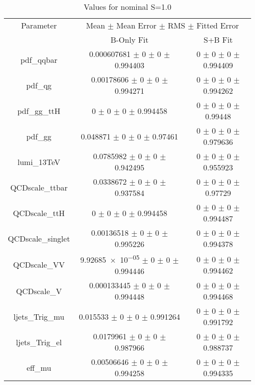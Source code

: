 \begin{table}
\centering
\caption{Values for nominal S=1.0}
\begin{tabular}{ccc}
\toprule
Parameter 	& \multicolumn{2}{c}{Mean $\pm$ Mean Error $\pm$ RMS $\pm$ Fitted Error}\\
 	& B-Only Fit & S+B Fit\\
\midrule
pdf\_qqbar 	& \num{0.000607681} $\pm$ \num{0} $\pm$ \num{0} $\pm$ \num{0.994403} 	& \num{0} $\pm$ \num{0} $\pm$ \num{0} $\pm$ \num{0.994409}\\
pdf\_qg 	& \num{0.00178606} $\pm$ \num{0} $\pm$ \num{0} $\pm$ \num{0.994271} 	& \num{0} $\pm$ \num{0} $\pm$ \num{0} $\pm$ \num{0.994262}\\
pdf\_gg\_ttH 	& \num{0} $\pm$ \num{0} $\pm$ \num{0} $\pm$ \num{0.994458} 	& \num{0} $\pm$ \num{0} $\pm$ \num{0} $\pm$ \num{0.99448}\\
pdf\_gg 	& \num{0.048871} $\pm$ \num{0} $\pm$ \num{0} $\pm$ \num{0.97461} 	& \num{0} $\pm$ \num{0} $\pm$ \num{0} $\pm$ \num{0.979636}\\
lumi\_13TeV 	& \num{0.0785982} $\pm$ \num{0} $\pm$ \num{0} $\pm$ \num{0.942495} 	& \num{0} $\pm$ \num{0} $\pm$ \num{0} $\pm$ \num{0.955923}\\
QCDscale\_ttbar 	& \num{0.0338672} $\pm$ \num{0} $\pm$ \num{0} $\pm$ \num{0.937584} 	& \num{0} $\pm$ \num{0} $\pm$ \num{0} $\pm$ \num{0.97729}\\
QCDscale\_ttH 	& \num{0} $\pm$ \num{0} $\pm$ \num{0} $\pm$ \num{0.994458} 	& \num{0} $\pm$ \num{0} $\pm$ \num{0} $\pm$ \num{0.994487}\\
QCDscale\_singlet 	& \num{0.00136518} $\pm$ \num{0} $\pm$ \num{0} $\pm$ \num{0.995226} 	& \num{0} $\pm$ \num{0} $\pm$ \num{0} $\pm$ \num{0.994378}\\
QCDscale\_VV 	& \num{9.92685e-05} $\pm$ \num{0} $\pm$ \num{0} $\pm$ \num{0.994446} 	& \num{0} $\pm$ \num{0} $\pm$ \num{0} $\pm$ \num{0.994462}\\
QCDscale\_V 	& \num{0.000133445} $\pm$ \num{0} $\pm$ \num{0} $\pm$ \num{0.994448} 	& \num{0} $\pm$ \num{0} $\pm$ \num{0} $\pm$ \num{0.994468}\\
ljets\_Trig\_mu 	& \num{0.015533} $\pm$ \num{0} $\pm$ \num{0} $\pm$ \num{0.991264} 	& \num{0} $\pm$ \num{0} $\pm$ \num{0} $\pm$ \num{0.991792}\\
ljets\_Trig\_el 	& \num{0.0179961} $\pm$ \num{0} $\pm$ \num{0} $\pm$ \num{0.987966} 	& \num{0} $\pm$ \num{0} $\pm$ \num{0} $\pm$ \num{0.988737}\\
eff\_mu 	& \num{0.00506646} $\pm$ \num{0} $\pm$ \num{0} $\pm$ \num{0.994258} 	& \num{0} $\pm$ \num{0} $\pm$ \num{0} $\pm$ \num{0.994335}\\

\end{tabular}
\end{table}
